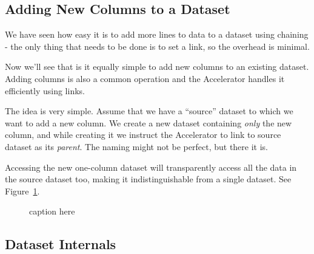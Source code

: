 \documentclass[a4paper]{article}
\begin{document}
\clearpage







\subsection{Adding New Columns to a Dataset}
We have seen how easy it is to add more lines to data to a dataset
using chaining - the only thing that needs to be done is to set a
link, so the overhead is minimal.

Now we'll see that is it equally simple to add new columns to an
existing dataset.  Adding columns is also a common operation and the
Accelerator handles it efficiently using links.

The idea is very simple.  Assume that we have a ``source'' dataset to
which we want to add a new column.  We create a new dataset containing
\textsl{only} the new column, and while creating it we instruct the
Accelerator to link to source dataset as its \textsl{parent}.  The
naming might not be perfect, but there it is.

Accessing the new one-column dataset will transparently access all the
data in the source dataset too, making it indistinguishable from a
single dataset.  See Figure~\ref{fig:dep_dataset_append_column}.

\begin{figure}[h!]
  \begin{center}
    
    \caption{caption here}
    \label{fig:dep_dataset_append_column}
  \end{center}
\end{figure}

\clearpage





\subsection{Dataset Internals}
\end{document}
